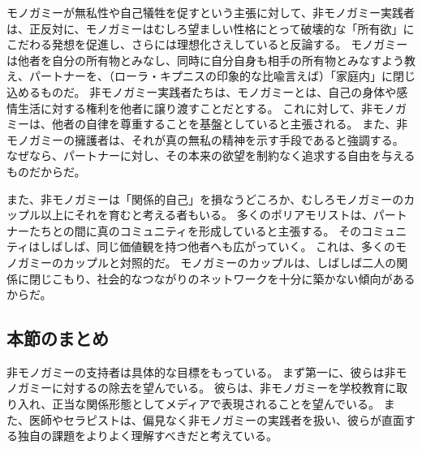 \documentclass[paper=a4,book,openany]{jlreq}
\begin{document}
モノガミーが無私性や自己犠牲を促すという主張に対して、非モノガミー実践者は、正反対に、モノガミーはむしろ望ましい性格にとって破壊的な「所有欲」にこだわる発想を促進し、さらには理想化さえしていると反論する。
モノガミーは他者を自分の所有物とみなし、同時に自分自身も相手の所有物とみなすよう教え、パートナーを、（ローラ・キプニスの印象的な比喩言えば）「家庭内」に閉じ込めるものだ。
非モノガミー実践者たちは、モノガミーとは、自己の身体や感情生活に対する権利を他者に譲り渡すことだとする。
これに対して、非モノガミーは、他者の自律を尊重することを基盤としていると主張される。
また、非モノガミーの擁護者は、それが真の無私の精神を示す手段であると強調する。
なぜなら、パートナーに対し、その本来の欲望を制約なく追求する自由を与えるものだからだ。

また、非モノガミーは「関係的自己」を損なうどころか、むしろモノガミーのカップル以上にそれを育むと考える者もいる。
多くのポリアモリストは、パートナーたちとの間に真のコミュニティを形成していると主張する。
そのコミュニティはしばしば、同じ価値観を持つ他者へも広がっていく。
これは、多くのモノガミーのカップルと対照的だ。
モノガミーのカップルは、しばしば二人の関係に閉じこもり、社会的なつながりのネットワークを十分に築かない傾向があるからだ。

\subsection{本節のまとめ}

非モノガミーの支持者は具体的な目標をもっている。
まず第一に、彼らは非モノガミーに対するの除去を望んでいる。
彼らは、非モノガミーを学校教育に取り入れ、正当な関係形態としてメディアで表現されることを望んでいる。
また、医師やセラピストは、偏見なく非モノガミーの実践者を扱い、彼らが直面する独自の課題をよりよく理解すべきだと考えている。
\end{document}
